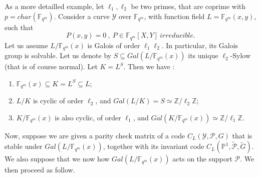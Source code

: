 \documentclass[10pt]{article}
\newcommand{\Z}{\mathbb{Z}}
\newcommand{\fqm}{\mathbb{F}_{q^m}}
\newcommand{\su}{\subseteq}
\newcommand{\Y}{\mathcal{Y}}
\newcommand{\PR}{\mathcal{P}}
\begin{document}
As a more detailled example, let $\ell_1,\ell_2$ be two primes, that are coprime with $p=char(\fqm)$. Consider a curve $\Y$ over $\fqm$, with function field $L = \fqm(x,y)$, such that
\[P(x,y) = 0 \ , \ P \in \fqm[X,Y] \ irreducible .\]
Let us assume $L/\fqm(x)$ is Galois of order $\ell_1\ell_2$. In particular, its Galois group is solvable. Let us denote by $S \su Gal(L/\fqm(x))$ its unique $\ell_2$-Sylow (that is of course normal). Let $K = L^S$. Then we have :
\begin{enumerate}
\item  $\fqm(x) \su K=L^S \su L$;
\item $L/K$ is cyclic of order $\ell_2$, and $Gal(L/K) = S \simeq \Z/\ell_2\Z$;
\item $K/\fqm(x)$ is also cyclic, of order $\ell_1$, and $Gal(K/\fqm(x)) \simeq \Z/\ell_1\Z$.
\end{enumerate}

Now, suppose we are given a parity check matrix of a code $C_L(\Y,\PR,G)$ that is stable under $Gal(L/\fqm(x))$, together with its invariant code $C_L(\mathbb{P}^1,\tilde{\PR},\tilde{G})$. We also suppose that we now how $Gal(L/\fqm(x))$ acts on the support $\PR$. We then proceed as follow.
\end{document}
